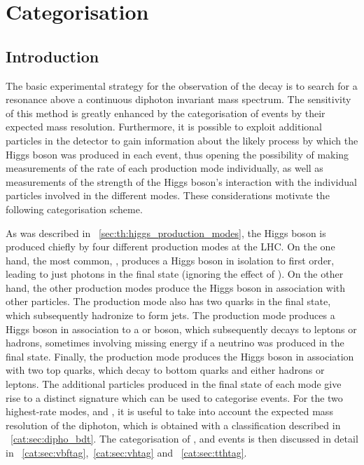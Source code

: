 \chapter{Categorisation}
\label{chap:categorisation}

\section{Introduction}
\label{cat:sec:intro}

The basic experimental strategy for the observation of the \Hgg decay is to search for a resonance above a continuous \SM diphoton invariant mass spectrum. The sensitivity of this method is greatly enhanced by the categorisation of events by their expected mass resolution. Furthermore, it is possible to exploit additional particles in the detector to gain information about the likely process by which the Higgs boson was produced in each event, thus opening the possibility of making measurements of the rate of each production mode individually, as well as measurements of the strength of the Higgs boson's interaction with the individual particles involved in the different modes. These considerations motivate the following categorisation scheme. 

As was described in \Sec~\ref{sec:th:higgs_production_modes}, the Higgs boson is produced chiefly by four different production modes at the LHC. On the one hand, the most common, \ggH, produces a Higgs boson in isolation to first order, leading to just photons in the final state (ignoring the effect of \PU). On the other hand, the other production modes produce the Higgs boson in association with other particles. The \VBF production mode also has two quarks in the final state, which subsequently hadronize to form jets. The \VH production mode produces a Higgs boson in association to a \PW or \PZ boson, which subsequently decays to leptons or hadrons, sometimes involving missing energy if a neutrino was produced in the final state. Finally, the \ttH production mode produces the Higgs boson in association with two top quarks, which decay to bottom quarks and either hadrons or leptons. The additional particles produced in the final state of each mode give rise to a distinct signature which can be used to categorise events. For the two highest-rate modes, \ggH and \ttH, it is useful to take into account the expected mass resolution of the diphoton, which is obtained with a classification \BDT described in \Sec~\ref{cat:sec:dipho_bdt}. The categorisation of \VBF, \VH and \ttH events is then discussed in detail in \Sec\s~\ref{cat:sec:vbftag},~\ref{cat:sec:vhtag} and ~\ref{cat:sec:tthtag}.

